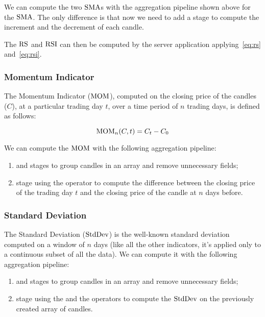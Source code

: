 We can compute the two \(\operatorname{SMA}\)s with the aggregation pipeline shown above for
the \(\operatorname{SMA}\). The only difference is that now we need to add a stage to compute
the increment and the decrement of each candle.

The \(\operatorname{RS}\) and \(\operatorname{RSI}\) can then be computed by the server application
applying~\eqref{eq:rs} and~\eqref{eq:rsi}.

\subsubsection{Momentum Indicator}

The Momentum Indicator (\(\operatorname{MOM}\)), computed on the closing price of the candles
(\(C\)), at a particular trading day \(t\), over a time period of \(n\) trading
days, is defined as follows:

\begin{equation}\label{eq:mom}
	\operatorname{MOM}_n(C,t) = C_t - C_0
\end{equation}

We can compute the \(\operatorname{MOM}\) with the following aggregation pipeline:

\begin{enumerate}
	\item {} and  stages to group candles in an
		array and remove unnecessary fields;
	\item {} stage using the  operator to
		compute the difference between the closing price of the trading
		day \(t\) and the closing price of the candle at \(n\) days
		before.
\end{enumerate}

\subsubsection{Standard Deviation}

The Standard Deviation (\(\operatorname{StdDev}\)) is the well-known standard deviation
computed on a window of \(n\) days (like all the other indicators, it's applied
only to a continuous subset of all the data). We can compute it with the
following aggregation pipeline:

\begin{enumerate}
	\item {} and  stages to group candles in an
		array and remove unnecessary fields;
	\item {} stage using the  and the
		 operators to compute the \(\operatorname{StdDev}\) on the
		previously created array of candles.
\end{enumerate}
